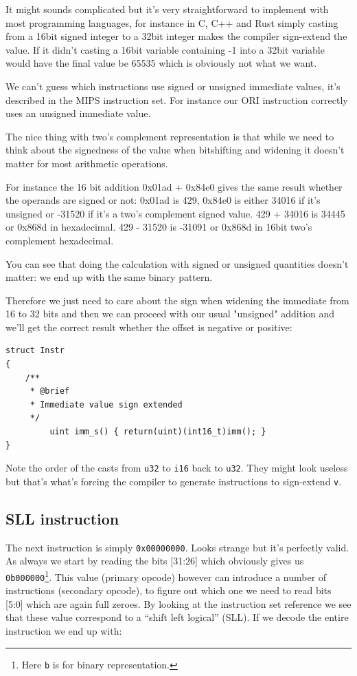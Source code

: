 \documentclass[a4paper]{article}
\newcommand{\code}[1] {\texttt{#1}}
\begin{document}
It might sounds complicated but it's very straightforward to implement
with most programming languages, for instance in C, C++ and Rust
simply casting from a 16bit signed integer to a 32bit integer makes
the compiler sign-extend the value. If it didn't casting a 16bit
variable containing -1 into a 32bit variable would have the final
value be 65535 which is obviously not what we want.

We can't guess which instructions use signed or unsigned immediate
values, it's described in the MIPS instruction set. For instance our
ORI instruction correctly uses an unsigned immediate value.

The nice thing with two's complement representation is that while we
need to think about the signedness of the value when bitshifting and
widening it doesn't matter for most arithmetic operations.

For instance the 16 bit addition 0x01ad + 0x84e0 gives the same result
whether the operands are signed or not: 0x01ad is 429, 0x84e0 is
either 34016 if it's unsigned or -31520 if it's a two's complement
signed value. 429 + 34016 is 34445 or 0x868d in hexadecimal. 429 -
31520 is -31091 or 0x868d in 16bit two's complement hexadecimal.

You can see that doing the calculation with signed or unsigned
quantities doesn't matter: we end up with the same binary pattern.

Therefore we just need to care about the sign when widening the
immediate from 16 to 32 bits and then we can proceed with our usual
"unsigned" addition and we'll get the correct result whether the
offset is negative or positive:

\begin{lstlisting}[caption={Signed immediate}, label={code:signedimm}]
struct Instr
{
	/**
	 * @brief
	 * Immediate value sign extended
	 */
         uint imm_s() { return(uint)(int16_t)imm(); }
}
\end{lstlisting}

Note the order of the casts from \code{u32} to \code{i16} back to
\code{u32}. They might look useless but that's what's forcing the
compiler to generate instructions to sign-extend \code{v}.

\subsection{SLL instruction}

The next instruction is simply \code{0x00000000}. Looks strange but
it's perfectly valid. As always we start by reading the bits [31:26]
which obviously gives us \code{0b000000}\footnote{Here \code{b} is for binary
representation.}. This value (primary opcode) however can
introduce a number of instructions (secondary opcode), to figure out which one we need to
read bits [5:0] which are again full zeroes. By looking at the
instruction set reference we see that these value correspond to a
``shift left logical'' (SLL). If we decode the entire instruction we
end up with:
\end{document}
